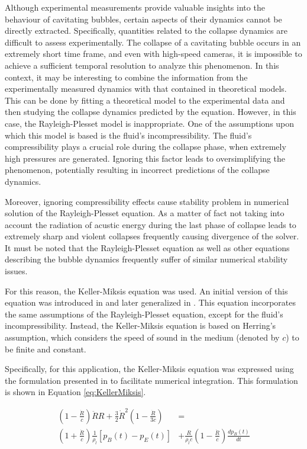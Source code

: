Although experimental measurements provide valuable insights into the behaviour of cavitating bubbles, certain aspects of their dynamics cannot be directly extracted. Specifically, quantities related to the collapse dynamics are difficult to assess experimentally. The collapse of a cavitating bubble occurs in an extremely short time frame, and even with high-speed cameras, it is impossible to achieve a sufficient temporal resolution to analyze this phenomenon.
In this context, it may be interesting to combine the information from the experimentally measured dynamics with that contained in theoretical models. This can be done by fitting a theoretical model to the experimental data and then studying the collapse dynamics predicted by the equation.
However, in this case, the Rayleigh-Plesset model is inappropriate. One of the assumptions upon which this model is based is the fluid's incompressibility. The fluid's compressibility plays a crucial role during the collapse phase, when extremely high pressures are generated. Ignoring this factor leads to oversimplifying the phenomenon, potentially resulting in incorrect predictions of the collapse dynamics.

Moreover, ignoring compressibility effects cause stability problem in numerical solution of the Rayleigh-Plesset equation. As a matter of fact not taking into account the radiation of acustic energy during the last phase of collapse leads to extremely sharp and violent collapses frequently causing divergence of the solver. It must be noted that the Rayleigh-Plesset equation as well as other equations describing the bubble dynamics frequently suffer of similar numerical stability issues.

For this reason, the Keller-Miksis equation was used. An initial version of this equation was introduced in \cite{Keller1956} and later generalized in \cite{Keller1980}.
This equation incorporates the same assumptions of the Rayleigh-Plesset equation, except for the fluid's incompressibility. Instead, the Keller-Miksis equation is based on Herring's assumption, which considers the speed of sound in the medium (denoted by $c$) to be finite and constant.

Specifically, for this application, the Keller-Miksis equation was expressed using the formulation presented in \cite{Lauterborn2010} to facilitate numerical integration. This formulation is shown in Equation \ref{eq:KellerMiksis}.

\begin{equation}
    \begin{split}
        \left( 1 - \frac{\dot{R}}{c} \right) \ddot{R} R + \frac{3}{2} \dot{R}^2 \left( 1 - \frac{\dot{R}}{3c} \right) &= \\
        \left( 1 + \frac{\dot{R}}{c} \right) \frac{1}{\rho_l} \left[ p_B(t) - p_E(t) \right] &+ \frac{R}{\rho_l c} \left( 1 - \frac{\dot{R}}{c} \right) \frac{dp_B(t)}{dt}
    \end{split}
    \label{eq:KellerMiksis}
\end{equation}

